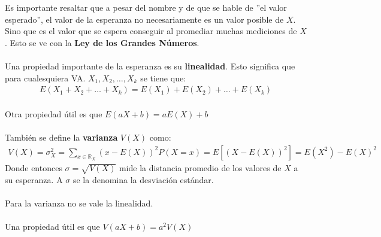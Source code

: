 \documentclass[../main.tex]{subfiles}
\begin{document}
Es importante resaltar que a pesar del nombre y de que se hable de ''el valor esperado'', el valor de la esperanza no necesariamente es un valor posible de \(X\). Sino que es el valor que se espera conseguir al promediar muchas mediciones de \(X\). Esto se ve con la \textbf{Ley de los Grandes Números}.

\paragraph{} Una propiedad importante de la esperanza es su \textbf{linealidad}. Esto significa que para cualesquiera VA. \(X_{1}, X_{2}, \ldots, X_{k}\) se tiene que:
\begin{gather*}
  E(X_{1} + X_{2} + \ldots + X_{k}) = E(X_{1}) + E(X_{2}) + \ldots + E(X_{k})
\end{gather*}

\paragraph{} Otra propiedad útil es que \(E(aX + b) = aE(X) + b\)

\paragraph{} También se define la \textbf{varianza} \(V(X)\) como:
\begin{gather*}
  V(X) = \sigma^{2}_{X} = \sum_{x \in \mathbb{R}_{X}}(x - E(X))^{2}P(X = x) = E[(X - E(X))^{2}] = E(X^{2}) - E(X)^{2}
\end{gather*}
Donde entonces \(\sigma = \sqrt{V(X)}\) mide la distancia promedio de los valores de \(X\) a su esperanza. A \(\sigma\) se la denomina la desviación estándar.

\paragraph{} Para la varianza no se vale la linealidad.
\paragraph{} Una propiedad útil es que \(V(aX + b) = a^{2}V(X)\)

\end{document}
